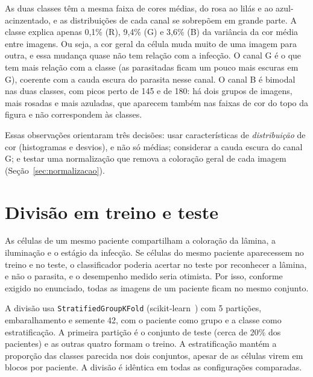 \documentclass[11pt,a4paper]{article}
\begin{document}
As duas classes têm a mesma faixa de cores médias, do rosa ao lilás e ao azul-acinzentado, e as
distribuições de cada canal se sobrepõem em grande parte. A classe explica apenas 0,1\% (R), 9,4\%
(G) e 3,6\% (B) da variância da cor média entre imagens. Ou seja, a cor geral da célula muda muito
de uma imagem para outra, e essa mudança quase não tem relação com a infecção. O canal G é o que tem
mais relação com a classe (as parasitadas ficam um pouco mais escuras em G), coerente com a cauda
escura do parasita nesse canal. O canal B é bimodal nas duas classes, com picos perto de 145 e de
180: há dois grupos de imagens, mais rosadas e mais azuladas, que aparecem também nas faixas de cor
do topo da figura e não correspondem às classes.

Essas observações orientaram três decisões: usar características de \emph{distribuição} de cor
(histogramas e desvios), e não só médias; considerar a cauda escura do canal G; e testar uma
normalização que remova a coloração geral de cada imagem (Seção~\ref{sec:normalizacao}).

\section{Divisão em treino e teste}\label{sec:divisao}

As células de um mesmo paciente compartilham a coloração da lâmina, a iluminação e o estágio da
infecção. Se células do mesmo paciente aparecessem no treino e no teste, o classificador poderia
acertar no teste por reconhecer a lâmina, e não o parasita, e o desempenho medido seria otimista. Por
isso, conforme exigido no enunciado, todas as imagens de um paciente ficam no mesmo conjunto.

A divisão usa \texttt{StratifiedGroupKFold} (scikit-learn~\cite{sklearn}) com 5 partições,
embaralhamento e semente 42, com o paciente como grupo e a classe como estratificação. A primeira
partição é o conjunto de teste (cerca de 20\% dos pacientes) e as outras quatro formam o treino. A
estratificação mantém a proporção das classes parecida nos dois conjuntos, apesar de as células
virem em blocos por paciente. A divisão é idêntica em todas as configurações comparadas.
\end{document}
